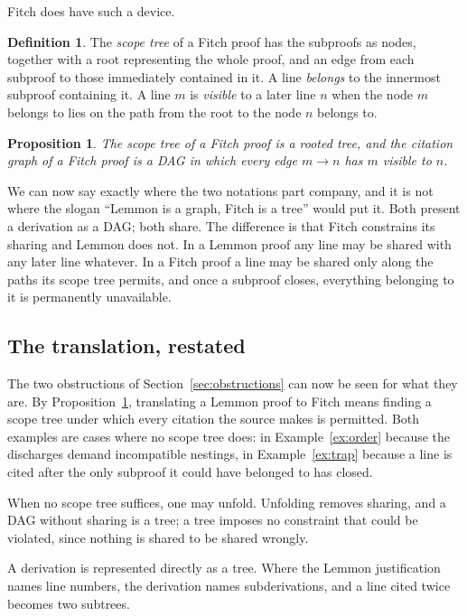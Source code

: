 \documentclass[11pt]{article}
\theoremstyle{plain}
\newtheorem{proposition}[theorem]{Proposition}
\theoremstyle{definition}
\newtheorem{definition}[theorem]{Definition}
\theoremstyle{remark}
\begin{document}
Fitch does have such a device.

\begin{definition}
The \emph{scope tree} of a Fitch proof has the subproofs as nodes, together
with a root representing the whole proof, and an edge from each subproof to
those immediately contained in it. A line \emph{belongs} to the innermost
subproof containing it. A line $m$ is \emph{visible} to a later line $n$ when
the node $m$ belongs to lies on the path from the root to the node $n$ belongs
to.
\end{definition}

\begin{proposition}\label{prop:fitchtree}
The scope tree of a Fitch proof is a rooted tree, and the citation graph of a
Fitch proof is a DAG in which every edge $m \to n$ has $m$ visible to $n$.
\end{proposition}

We can now say exactly where the two notations part company, and it is not
where the slogan ``Lemmon is a graph, Fitch is a tree'' would put it. Both
present a derivation as a DAG; both share. The difference is that Fitch
constrains its sharing and Lemmon does not. In a Lemmon proof any line may be
shared with any later line whatever. In a Fitch proof a line may be shared
only along the paths its scope tree permits, and once a subproof closes,
everything belonging to it is permanently unavailable.

\subsection{The translation, restated}

The two obstructions of Section~\ref{sec:obstructions} can now be seen for
what they are. By Proposition~\ref{prop:fitchtree}, translating a Lemmon proof
to Fitch means finding a scope tree under which every citation the source
makes is permitted. Both examples are
cases where no scope tree does: in Example~\ref{ex:order} because the
discharges demand incompatible nestings, in Example~\ref{ex:trap} because a
line is cited after the only subproof it could have belonged to has closed.

When no scope tree suffices, one may unfold. Unfolding removes sharing, and a
DAG without sharing is a tree; a tree imposes no constraint that could be
violated, since nothing is shared to be shared wrongly.

A derivation is represented directly as a tree. Where the Lemmon
justification names line numbers, the derivation names subderivations, and a
line cited twice becomes two subtrees.
\end{document}
